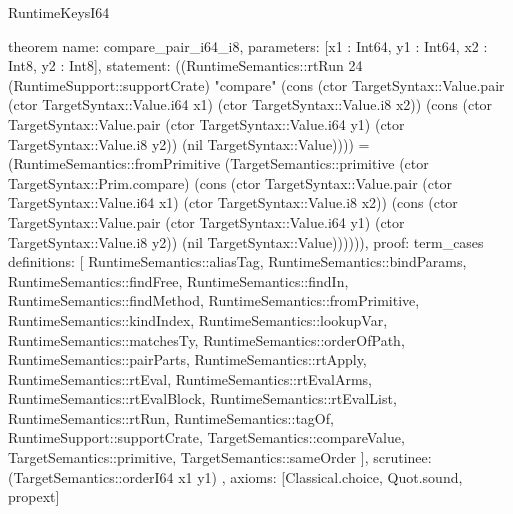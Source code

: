 \begin{lexlean}{RuntimeKeysI64}
\begin{semanticmodule}
theorem{
  name: compare_pair_i64_i8,
  parameters: [x1 : Int64, y1 : Int64, x2 : Int8, y2 : Int8],
  statement: ((RuntimeSemantics::rtRun 24 (RuntimeSupport::supportCrate) "compare" (cons (ctor TargetSyntax::Value.pair (ctor TargetSyntax::Value.i64 x1) (ctor TargetSyntax::Value.i8 x2)) (cons (ctor TargetSyntax::Value.pair (ctor TargetSyntax::Value.i64 y1) (ctor TargetSyntax::Value.i8 y2)) (nil TargetSyntax::Value)))) = (RuntimeSemantics::fromPrimitive (TargetSemantics::primitive (ctor TargetSyntax::Prim.compare) (cons (ctor TargetSyntax::Value.pair (ctor TargetSyntax::Value.i64 x1) (ctor TargetSyntax::Value.i8 x2)) (cons (ctor TargetSyntax::Value.pair (ctor TargetSyntax::Value.i64 y1) (ctor TargetSyntax::Value.i8 y2)) (nil TargetSyntax::Value)))))),
  proof: term_cases{
    definitions: [
      RuntimeSemantics::aliasTag,
      RuntimeSemantics::bindParams,
      RuntimeSemantics::findFree,
      RuntimeSemantics::findIn,
      RuntimeSemantics::findMethod,
      RuntimeSemantics::fromPrimitive,
      RuntimeSemantics::kindIndex,
      RuntimeSemantics::lookupVar,
      RuntimeSemantics::matchesTy,
      RuntimeSemantics::orderOfPath,
      RuntimeSemantics::pairParts,
      RuntimeSemantics::rtApply,
      RuntimeSemantics::rtEval,
      RuntimeSemantics::rtEvalArms,
      RuntimeSemantics::rtEvalBlock,
      RuntimeSemantics::rtEvalList,
      RuntimeSemantics::rtRun,
      RuntimeSemantics::tagOf,
      RuntimeSupport::supportCrate,
      TargetSemantics::compareValue,
      TargetSemantics::primitive,
      TargetSemantics::sameOrder
    ],
    scrutinee: (TargetSemantics::orderI64 x1 y1)
  },
  axioms: [Classical.choice, Quot.sound, propext]
}


\end{semanticmodule}
\end{lexlean}
